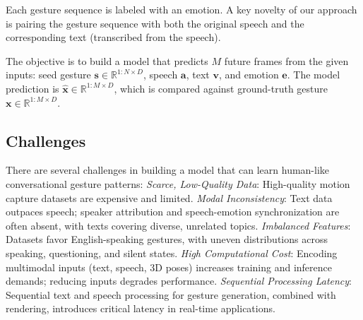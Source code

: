 Each gesture sequence is labeled with an emotion. A key novelty of our approach is pairing the gesture sequence with both the original speech and the corresponding text (transcribed from the speech).

The objective is to build a model that predicts $M$ future frames from the given inputs: seed gesture $\mathbf{s} \in \mathbb{R}^{1:N \times D}$, speech $\mathbf{a}$, text $\mathbf{v}$, and emotion $\mathbf{e}$. The model prediction is $\hat{\mathbf{x}} \in \mathbb{R}^{1:M \times D}$, which is compared against ground-truth gesture $\mathbf{x} \in \mathbb{R}^{1:M \times D}$.


\subsection{Challenges}
\label{sec:difficult}

There are several challenges in building a model that can learn human-like conversational gesture patterns: \textit{Scarce, Low-Quality Data}: High-quality motion capture datasets are expensive and limited.
\textit{Modal Inconsistency}: Text data outpaces speech; speaker attribution and speech-emotion synchronization are often absent, with texts covering diverse, unrelated topics.
\textit{Imbalanced Features}: Datasets favor English-speaking gestures, with uneven distributions across speaking, questioning, and silent states.
\textit{High Computational Cost}: Encoding multimodal inputs (text, speech, 3D poses) increases training and inference demands; reducing inputs degrades performance.
\textit{Sequential Processing Latency}: Sequential text and speech processing for gesture generation, combined with rendering, introduces critical latency in real-time applications.

